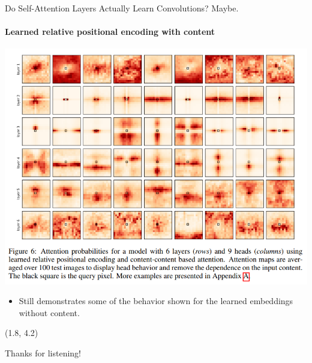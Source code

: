 \documentclass[9pt]{beamer}
\begin{document}
\begin{frame}{Do Self-Attention Layers Actually Learn Convolutions? Maybe.}
\framesubtitle{Learned relative positional encoding with content}
\begin{center}
    \includegraphics[width=.68\textwidth]{
        presentation/images/learned_rel_emb_content.png}
    \vspace{-.1in}
\end{center}
\begin{itemize}
\item Still demonstrates some of the behavior shown for the learned embeddings without content.
\end{itemize}
\end{frame}


\begin{frame}
\begin{textblock}{8}(1.8, 4.2) \raggedright \Huge 
    Thanks for listening!
\end{textblock}
\end{frame}
\usebackgroundtemplate{ } %
\end{document}
